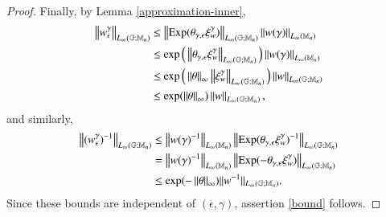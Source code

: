 \documentclass[leqno]{amsart}
\begin{document}
\begin{proof}
		
		
		Finally, by Lemma \ref{approximation-inner},
		\begin{align*}
			\norm{w^\gamma_\epsilon}_{\lgm{n}}&\leq \norm{\Exp(\theta_{\gamma,\epsilon}\xi^\gamma_w)}_{\lgm{n}}\norm{w(\gamma)}_{\lm{n}}\\
			&\leq\exp\Big(\norm{\theta_{\gamma,\epsilon}\xi^\gamma_w}_{\lgm{n}}\Big)\norm{w(\gamma)}_{\lm{n}}\\
			&\leq \exp\Big(\norm{\theta}_\infty \norm{\xi^\gamma_w}_{\lgm{n}}\Big)\norm{w}_{\lgm{n}}\\
			&\leq \exp(\norm{\theta}_\infty)\norm{w}_{\lgm{n}},
		\end{align*}
		and similarly,
		\begin{align*}
			\norm{(w^\gamma_\epsilon)^{-1}}_{\lgm{n}}&\leq \norm{w(\gamma)^{-1}}_{\lm{n}}\norm{\Exp(\theta_{\gamma,\epsilon}\xi^\gamma_w)^{-1}}_{\lgm{n}}\\
			&=\norm{w(\gamma)^{-1}}_{\lm{n}}\norm{\Exp(-\theta_{\gamma,\epsilon}\xi^\gamma_w)}_{\lgm{n}}\\
			&\leq \exp(-\norm{\theta}_\infty)||w^{-1}||_{\lgm{n}}.
		\end{align*}
		Since these bounds are independent of $(\epsilon,\gamma)$, assertion \ref{bound} follows.
	\end{proof}
	
	
	
	
	
\end{document}
